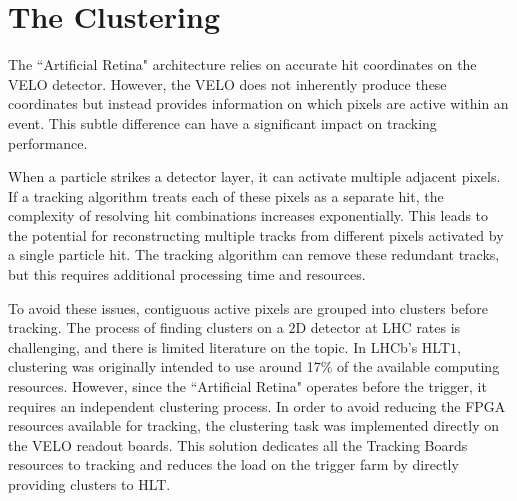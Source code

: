 



\section{The Clustering}

The ``Artificial Retina" architecture relies on accurate hit coordinates on the VELO detector. However, the VELO does not inherently produce these coordinates but instead provides information on which pixels are active within an event. This subtle difference can have a significant impact on tracking performance.

When a particle strikes a detector layer, it can activate multiple adjacent pixels. If a tracking algorithm treats each of these pixels as a separate hit, the complexity of resolving hit combinations increases exponentially. This leads to the potential for reconstructing multiple tracks from different pixels activated by a single particle hit. The tracking algorithm can remove these redundant tracks, but this requires additional processing time and resources.

To avoid these issues, contiguous active pixels are grouped into clusters before tracking. The process of finding clusters on a $2$D detector at LHC rates is challenging, and there is limited literature on the topic. In LHCb's HLT$1$, clustering was originally intended to use around 17\% of the available computing resources. However, since the ``Artificial Retina" operates before the trigger, it requires an independent clustering process. In order to avoid reducing the FPGA resources available for tracking, the clustering task was implemented directly on the VELO readout boards. This solution dedicates all the Tracking Boards resources to tracking and reduces the load on the trigger farm by directly providing clusters to HLT.

